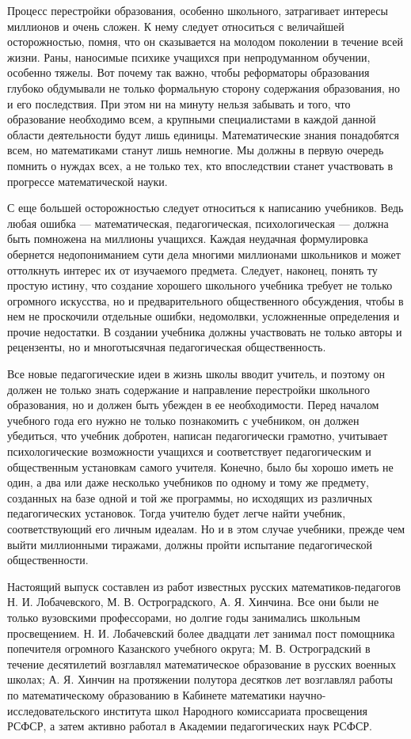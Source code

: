 \documentclass[12pt, a4paper, openany]{book}
\begin{document}
Процесс перестройки образования, особенно школьного, затрагивает интересы миллионов и очень сложен. К нему следует относиться с величайшей осторожностью, помня, что он сказывается на молодом поколении в течение всей жизни. Раны, наносимые психике учащихся при  непродуманном обучении, особенно тяжелы. Вот почему так  важно, чтобы реформаторы образования глубоко обдумывали не только формальную сторону содержания образования, но и его последствия. При этом ни на минуту нельзя забывать и того, что образование необходимо всем, а крупными специалистами в каждой данной области деятельности будут лишь единицы. Математические знания понадобятся всем, но математиками станут лишь немногие. Мы должны в  первую очередь помнить о нуждах всех, а не только тех, кто впоследствии станет участвовать в прогрессе  математической науки. 

С еще большей осторожностью следует относиться к  написанию учебников. Ведь любая ошибка —  математическая, педагогическая, психологическая — должна быть помножена на миллионы учащихся. Каждая неудачная формулировка обернется недопониманием сути дела  многими миллионами школьников и может оттолкнуть интерес их от изучаемого предмета. Следует, наконец, понять ту простую истину, что создание хорошего школьного  учебника требует не только огромного искусства, но и  предварительного общественного обсуждения, чтобы в нем не  проскочили отдельные ошибки, недомолвки, усложненные  определения и прочие недостатки. В создании учебника должны участвовать не только авторы и рецензенты, но и  многотысячная педагогическая общественность. 

Все новые педагогические идеи в жизнь школы вводит учитель, и поэтому он должен не только знать содержание и направление перестройки школьного образования, но и должен быть убежден в ее необходимости. Перед началом учебного года его нужно не только познакомить с  учебником, он должен убедиться, что учебник добротен, написан педагогически грамотно, учитывает психологические  возможности учащихся и соответствует педагогическим и  общественным установкам самого учителя. Конечно, было бы хорошо иметь не один, а два или даже несколько учебников по одному и тому же предмету, созданных на базе одной и той же программы, но исходящих из различных  педагогических установок. Тогда учителю будет легче найти  учебник, соответствующий его личным идеалам. Но и в этом случае учебники, прежде чем выйти миллионными  тиражами, должны пройти испытание педагогической  общественности. 

Настоящий выпуск составлен из работ известных  русских математиков-педагогов Н. И. Лобачевского, М. В.  Остроградского, А. Я. Хинчина. Все они были не только  вузовскими профессорами, но долгие годы занимались школьным просвещением. Н. И. Лобачевский более двадцати лет  занимал пост помощника попечителя огромного Казанского учебного округа; М. В. Остроградский в течение  десятилетий возглавлял математическое образование в русских  военных школах; А. Я. Хинчин на протяжении полутора  десятков лет возглавлял работы по математическому  образованию в Кабинете математики научно-исследовательского института школ Народного комиссариата просвещения РСФСР, а затем активно работал в Академии  педагогических наук РСФСР. 
\end{document}
